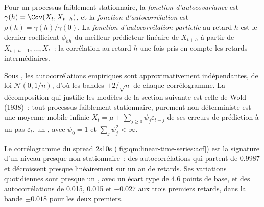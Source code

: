 \begin{definition}\label{def:qm:linear-time-series:acf}
Pour un processus faiblement stationnaire, la \emph{fonction d'autocovariance} est $\gamma(h) = \Cov(X_t, X_{t+h})$, et la
\emph{fonction d'autocorrélation} est $\rho(h) = \gamma(h)/\gamma(0)$. La \emph{fonction d'autocorrélation
partielle} au retard $h$ est le dernier coefficient $\phi_{hh}$ du meilleur prédicteur linéaire de $X_{t+h}$ à partir de $X_{t+h-1},
\dots, X_t$~: la corrélation au retard $h$ une fois pris en compte les retards intermédiaires.
\end{definition}

Sous , les autocorrélations empiriques sont approximativement indépendantes, de loi $\mathcal N(0, 1/n)$, d'où les bandes $\pm 2/\sqrt n$ de chaque
corrélogramme. La décomposition qui justifie les modèles de la section suivante est celle de Wold (1938)~: tout processus faiblement stationnaire, purement
non déterministe est une moyenne mobile infinie $X_t = \mu + \sum_{j \ge 0}\psi_j\varepsilon_{t-j}$ de ses erreurs de prédiction à un pas
$\varepsilon_t$, un , avec $\psi_0 = 1$ et $\sum_j\psi_j^2 < \infty$.

Le corrélogramme du spread 2s10s (\cref{fig:qm:linear-time-series:acf}) est la signature d'un niveau presque non stationnaire~: des autocorrélations
qui partent de 0.9987 et décroissent presque linéairement sur un an de retards. Ses variations quotidiennes sont presque un , avec un écart type de 4.6
points de base, et des autocorrélations de 0.015, 0.015 et $-0.027$ aux trois premiers retards, dans la bande $\pm 0.018$ pour les deux premiers.

